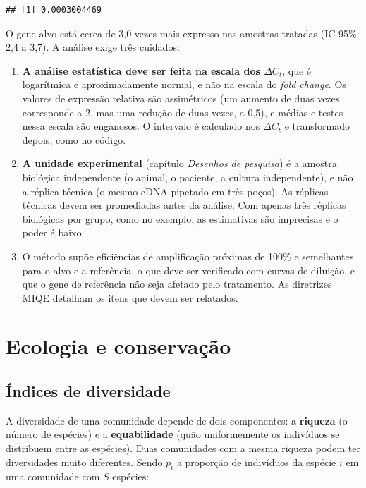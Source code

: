 \documentclass[
]{book}
\providecommand{\tightlist}{%
  \setlength{\itemsep}{0pt}\setlength{\parskip}{0pt}}
\begin{document}
\begin{verbatim}
## [1] 0.0003004469
\end{verbatim}

O gene-alvo está cerca de 3,0 vezes mais expresso nas amostras tratadas (IC 95\%: 2,4 a 3,7). A análise exige três cuidados:

\begin{enumerate}
\def\labelenumi{\arabic{enumi}.}
\tightlist
\item
  \textbf{A análise estatística deve ser feita na escala dos \(\Delta C_t\)}, que é logarítmica e aproximadamente normal, e não na escala do \emph{fold change}. Os valores de expressão relativa são assimétricos (um aumento de duas vezes corresponde a 2, mas uma redução de duas vezes, a 0,5), e médias e testes nessa escala são enganosos. O intervalo é calculado nos \(\Delta C_t\) e transformado depois, como no código.
\item
  \textbf{A unidade experimental} (capítulo \emph{Desenhos de pesquisa}) é a amostra biológica independente (o animal, o paciente, a cultura independente), e não a réplica técnica (o mesmo cDNA pipetado em três poços). As réplicas técnicas devem ser promediadas antes da análise. Com apenas três réplicas biológicas por grupo, como no exemplo, as estimativas são imprecisas e o poder é baixo.
\item
  O método supõe eficiências de amplificação próximas de 100\% e semelhantes para o alvo e a referência, o que deve ser verificado com curvas de diluição, e que o gene de referência não seja afetado pelo tratamento. As diretrizes MIQE detalham os itens que devem ser relatados.
\end{enumerate}

\section{Ecologia e conservação}\label{ecologia-e-conservauxe7uxe3o}

\subsection{Índices de diversidade}\label{uxedndices-de-diversidade}

A diversidade de uma comunidade depende de dois componentes: a \textbf{riqueza} (o número de espécies) e a \textbf{equabilidade} (quão uniformemente os indivíduos se distribuem entre as espécies). Duas comunidades com a mesma riqueza podem ter diversidades muito diferentes. Sendo \(p_i\) a proporção de indivíduos da espécie \(i\) em uma comunidade com \(S\) espécies:
\end{document}

